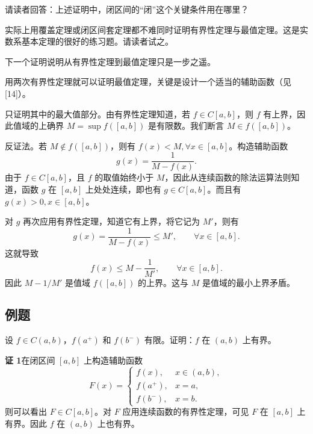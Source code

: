 \begin{xremark}
请读者回答：上述证明中，闭区间的“闭”这个关键条件用在哪里？
\end{xremark}

\begin{xremark}
实际上用覆盖定理或闭区间套定理都不难同时证明有界性定理与最值定理。这是实数系基本定理的很好的练习题。请读者试之。
\end{xremark}

下一个证明说明从有界性定理到最值定理只是一步之遥。

\begin{xexample}[5.3.2]
用两次有界性定理就可以证明最值定理，关键是设计一个适当的辅助函数（见 [14]）。
\end{xexample}
\begin{xproof}
只证明其中的最大值部分。由有界性定理知道，若 $f\in C[a,b]$，则 $f$ 有上界，因此值域的上确界 $M=\sup f([a,b])$ 是有限数。我们断言 $M\in f([a,b])$。

反证法。若 $M\notin f([a,b])$，则有 $f(x)<M,\forall x\in[a,b]$。构造辅助函数
\[
  g(x)=\frac1{M-f(x)}.
\]
由于 $f\in C[a,b]$，且 $f$ 的取值始终小于 $M$，因此从连续函数的除法运算法则知道，函数 $g$ 在 $[a,b]$ 上处处连续，即也有 $g\in C[a,b]$。而且有 $g(x)>0,x\in[a,b]$。

对 $g$ 再次应用有界性定理，知道它有上界，将它记为 $M'$，则有
\[
  g(x)=\frac1{M-f(x)}\le M',\qquad \forall x\in[a,b].
\]
这就导致
\[
  f(x)\le M-\frac1{M'},\qquad \forall x\in[a,b].
\]
因此 $M-1/M'$ 是值域 $f([a,b])$ 的上界。这与 $M$ 是值域的最小上界矛盾。
\end{xproof}

\subsection{例题}

\begin{xexample}[5.3.3]
设 $f\in C(a,b)$，$f(a^+)$ 和 $f(b^-)$ 有限。证明：$f$ 在 $(a,b)$ 上有界。
\end{xexample}
\begin{xproof}
\textbf{证 1}\quad 在闭区间 $[a,b]$ 上构造辅助函数
\[
  F(x)=\begin{cases}
    f(x),&x\in(a,b),\\
    f(a^+),&x=a,\\
    f(b^-),&x=b.
  \end{cases}
\]
则可以看出 $F\in C[a,b]$。对 $F$ 应用连续函数的有界性定理，可见 $F$ 在 $[a,b]$ 上有界。因此 $f$ 在 $(a,b)$ 上也有界。
\end{xproof}

